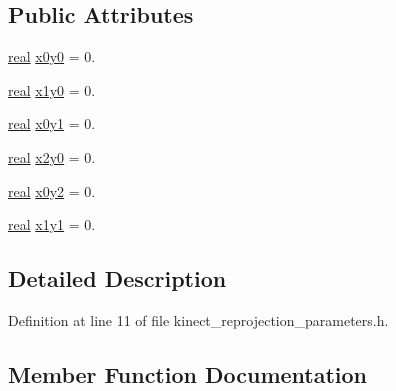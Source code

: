 \subsection*{Public Attributes}
\begin{DoxyCompactItemize}
\item 
\hyperlink{namespacetlz_a15fd37cce97f2b8b606af18c2615f602}{real} \hyperlink{structtlz_1_1kinect__reprojection__parameters_1_1depth__offset__polyfit_aa002a6e1adfa7d4d993c967fa5e0ec04}{x0y0} = 0.
\item 
\hyperlink{namespacetlz_a15fd37cce97f2b8b606af18c2615f602}{real} \hyperlink{structtlz_1_1kinect__reprojection__parameters_1_1depth__offset__polyfit_a05716b5c722f280ec0c01e203a162e97}{x1y0} = 0.
\item 
\hyperlink{namespacetlz_a15fd37cce97f2b8b606af18c2615f602}{real} \hyperlink{structtlz_1_1kinect__reprojection__parameters_1_1depth__offset__polyfit_a66f698d2768cf12f59f3810fb5389cea}{x0y1} = 0.
\item 
\hyperlink{namespacetlz_a15fd37cce97f2b8b606af18c2615f602}{real} \hyperlink{structtlz_1_1kinect__reprojection__parameters_1_1depth__offset__polyfit_a92b3758eeb45c26a7771827fa5ba5cfa}{x2y0} = 0.
\item 
\hyperlink{namespacetlz_a15fd37cce97f2b8b606af18c2615f602}{real} \hyperlink{structtlz_1_1kinect__reprojection__parameters_1_1depth__offset__polyfit_a4c029c2acd3f81c152a52f9243ad0579}{x0y2} = 0.
\item 
\hyperlink{namespacetlz_a15fd37cce97f2b8b606af18c2615f602}{real} \hyperlink{structtlz_1_1kinect__reprojection__parameters_1_1depth__offset__polyfit_ad94824250f7c6cbf3de12690bdfa29a7}{x1y1} = 0.
\end{DoxyCompactItemize}


\subsection{Detailed Description}


Definition at line 11 of file kinect\+\_\+reprojection\+\_\+parameters.\+h.



\subsection{Member Function Documentation}
